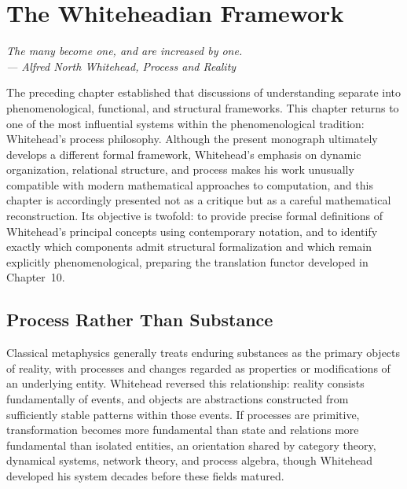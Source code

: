 \documentclass[11pt,twoside,openright]{book}
\numberwithin{equation}{chapter}
\theoremstyle{definition}
\theoremstyle{plain}
\theoremstyle{remark}
\theoremstyle{definition}
\begin{document}
\chapter{The Whiteheadian Framework}
\label{ch:whitehead}

\vspace{1em}
\begin{flushright}\itshape
The many become one, and are increased by one.\\
\upshape --- Alfred North Whitehead, \emph{Process and Reality}
\end{flushright}
\vspace{1em}

The preceding chapter established that discussions of understanding
separate into phenomenological, functional, and structural frameworks.
This chapter returns to one of the most influential systems within the
phenomenological tradition: Whitehead's process philosophy. Although the
present monograph ultimately develops a different formal framework,
Whitehead's emphasis on dynamic organization, relational structure, and
process makes his work unusually compatible with modern mathematical
approaches to computation, and this chapter is accordingly presented not
as a critique but as a careful mathematical reconstruction. Its objective
is twofold: to provide precise formal definitions of Whitehead's
principal concepts using contemporary notation, and to identify exactly
which components admit structural formalization and which remain
explicitly phenomenological, preparing the translation functor developed
in Chapter~10.

\section{Process Rather Than Substance}

Classical metaphysics generally treats enduring substances as the primary
objects of reality, with processes and changes regarded as properties or
modifications of an underlying entity. Whitehead reversed this
relationship: reality consists fundamentally of events, and objects are
abstractions constructed from sufficiently stable patterns within those
events. If processes are primitive, transformation becomes more
fundamental than state and relations more fundamental than isolated
entities, an orientation shared by category theory, dynamical systems,
network theory, and process algebra, though Whitehead developed his
system decades before these fields matured.
\end{document}
